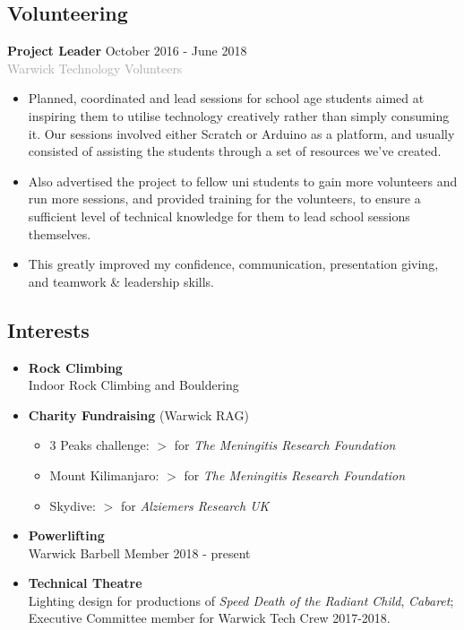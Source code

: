 \documentclass[11pt]{article}
\newcommand{\dash}{\item[-]}
\newcommand{\linesep}{\noindent\makebox[\linewidth]{\rule{\linewidth}{0.2pt}}}
\begin{document}
  \subsection*{Volunteering}
\textbf{Project Leader} \hfill October 2016 - June 2018 \\
\textcolor{darkgray}{Warwick Technology Volunteers}
   \begin{itemize}
    \dash Planned, coordinated and lead sessions for school age students aimed at inspiring them to utilise technology creatively rather than simply consuming it. Our sessions involved either Scratch or Arduino as a platform, and usually consisted of assisting the students through a set of resources we’ve created.
	\dash Also advertised the project to fellow uni students to gain more volunteers and run more sessions, and provided training for the volunteers, to ensure a sufficient level of technical knowledge for them to lead school sessions themselves.
	\dash This greatly improved my confidence, communication, presentation giving, and teamwork \& leadership skills.
   \end{itemize}

  \linesep

  \subsection*{Interests}
  \begin{itemize}
\dash \textbf{Rock Climbing} \\ Indoor Rock Climbing and Bouldering 
\dash \textbf{Charity Fundraising} (Warwick RAG)
   \begin{itemize}[topsep=3pt, itemsep=2pt, partopsep=0pt, parsep=0pt]
    \item[] 3 Peaks challenge: \hfill $>$ for \textit{The Meningitis Research Foundation}
    \item[] Mount Kilimanjaro: \hfill$>$ for \textit{The Meningitis Research Foundation}
    \item[] Skydive: \hfill $>$ for \textit{Alziemers Research UK}
   \end{itemize}
\dash \textbf{Powerlifting} \\ \indent Warwick Barbell Member 2018 - present 
\dash \textbf{Technical Theatre} \\ \indent Lighting design for productions of \textit{Speed Death of the Radiant
Child}, \textit{Cabaret}; \\ Executive Committee member for Warwick Tech Crew 2017-2018.
  \end{itemize}
\end{document}
